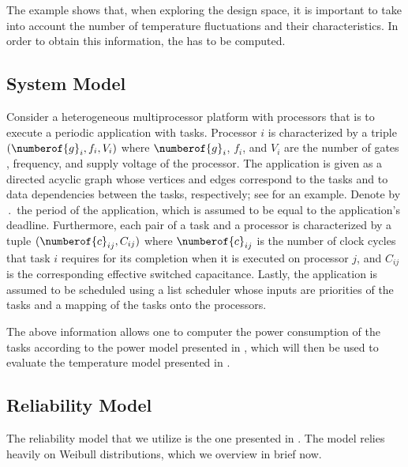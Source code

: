 The example shows that, when exploring the design space, it is important to
take into account the number of temperature fluctuations and their
characteristics. In order to obtain this information, the  has to be
computed.

\subsection{System Model}

Consider a heterogeneous multiprocessor platform with \np processors that is to
execute a periodic application with \nt tasks. Processor $i$ is characterized by
a triple $(\numberof{g}_i, f_i, V_i)$ where $\numberof{g}_i$, $f_i$, and $V_i$
are the number of gates \cite{liao2005}, frequency, and supply voltage of the
processor. The application is given as a directed acyclic graph whose vertices
and edges correspond to the tasks and to data dependencies between the tasks,
respectively; see  for an example. Denote by
$\period$ the period of the application, which is assumed to be equal to the
application's deadline. Furthermore, each pair of a task and a processor is
characterized by a tuple $(\numberof{c}_{ij}, C_{ij})$ where $\numberof{c}_{ij}$
is the number of clock cycles that task $i$ requires for its completion when it
is executed on processor $j$, and $C_{ij}$ is the corresponding effective
switched capacitance. Lastly, the application is assumed to be scheduled using a
list scheduler whose inputs are priorities of the tasks and a mapping of the
tasks onto the processors.

The above information allows one to computer the power consumption of the tasks
according to the power model presented in , which will then be
used to evaluate the temperature model presented in .

\subsection{Reliability Model}
\newcommand{\mean}{\mu}
\newcommand{\scale}{\eta}
\newcommand{\shape}{\beta}

The reliability model that we utilize is the one presented in \cite{huang2009,
xiang2010}. The model relies heavily on Weibull distributions, which we overview
in brief now.

